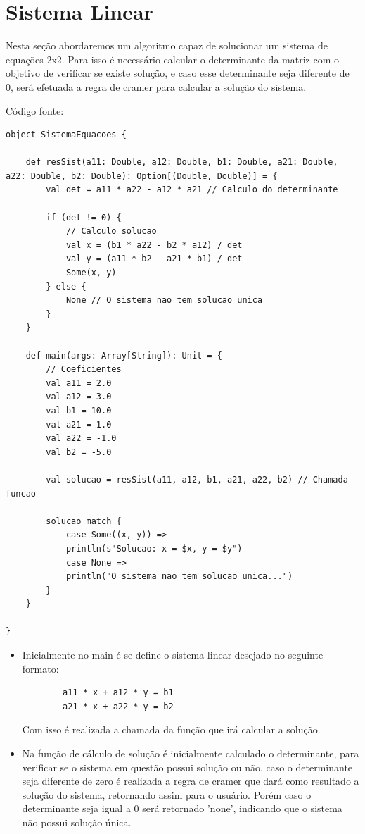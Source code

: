 	\section{Sistema Linear}
	
	Nesta seção abordaremos um algoritmo capaz de solucionar um sistema de equações 2x2. Para isso é necessário calcular o determinante da matriz com o objetivo de verificar se existe solução, e caso esse determinante seja diferente de 0, será efetuada a regra de cramer para calcular a solução do sistema.
	
	Código fonte: 
	
	\begin{lstlisting}[breaklines]
object SistemaEquacoes {
	
	def resSist(a11: Double, a12: Double, b1: Double, a21: Double, a22: Double, b2: Double): Option[(Double, Double)] = {
		val det = a11 * a22 - a12 * a21 // Calculo do determinante
		
		if (det != 0) {
			// Calculo solucao
			val x = (b1 * a22 - b2 * a12) / det
			val y = (a11 * b2 - a21 * b1) / det
			Some(x, y)
		} else {
			None // O sistema nao tem solucao unica
		}
	}
	
	def main(args: Array[String]): Unit = {
		// Coeficientes
		val a11 = 2.0
		val a12 = 3.0
		val b1 = 10.0
		val a21 = 1.0
		val a22 = -1.0
		val b2 = -5.0
		
		val solucao = resSist(a11, a12, b1, a21, a22, b2) // Chamada funcao
		
		solucao match {
			case Some((x, y)) =>
			println(s"Solucao: x = $x, y = $y")
			case None =>
			println("O sistema nao tem solucao unica...")
		}
	}
	
}
	\end{lstlisting}

 	\begin{itemize}
 		\item Inicialmente no main é se define o sistema linear desejado no seguinte formato:
 		\begin{lstlisting}
		a11 * x + a12 * y = b1
		a21 * x + a22 * y = b2
 		\end{lstlisting}
 		Com isso é realizada a chamada da função que irá calcular a solução.
 		\item Na função de cálculo de solução é inicialmente calculado o determinante, para verificar se o sistema em questão possui solução ou não, caso o determinante seja diferente de zero é realizada a regra de cramer que dará como resultado a solução do sistema, retornando assim para o usuário. Porém caso o determinante seja igual a 0 será retornado 'none', indicando que o sistema não possui solução única.
 	\end{itemize}
 
